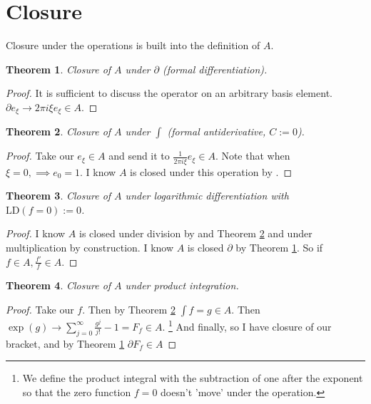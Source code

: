 \documentclass{artjlt}
\newtheorem{thm}{Theorem}
\newcommand{\?}{\textbackslash}
\begin{document}
\section{Closure}
   Closure under the operations is built into the definition of $A$.
   \begin{thm} \label{thm:1}
      Closure of $A$ under $\partial$ (formal differentiation).
   \end{thm}
   \begin{proof}
      It is sufficient to discuss the operator on an arbitrary basis element. $\partial e_\xi \to 2 \pi i \xi e_{\xi} \in A$.
   \end{proof}
   \begin{thm} \label{thm:2}
      Closure of $A$ under $\int$ (formal antiderivative, $C:=0$). 
   \end{thm}
   \begin{proof}
      Take our $e_\xi \in A$ and send it to $\frac{1}{2 \pi i \xi} e_{\xi} \in A$. Note that when $\xi = 0, \implies e_0 = 1$. I know $A$ is closed under this operation by \cite{Hormander1958}. 
   \end{proof}
   \begin{thm}
      Closure of $A$ under logarithmic differentiation with $\text{LD}(f=0) := 0$.
   \end{thm}
   \begin{proof}
      I know $A$ is closed under division by \cite{Hormander1958} and Theorem \ref{thm:2} and under multiplication by construction. I know $A$ is closed $\partial$ by Theorem \ref{thm:1}. So if $f \in A, \frac{f'}{f} \in A$.
   \end{proof}
   \begin{thm} \label{thm:4}
      Closure of $A$ under product integration.
   \end{thm}
   \begin{proof}
      Take our $f$. Then by Theorem \ref{thm:2} $\int f = g \in A$. Then $\exp(g) \to \sum_{j=0}^{\infty} \frac{g^j}{j!} - 1 = F_f \in A$. \footnote{We define the product integral with the subtraction of one after the exponent so that the zero function $f=0$ doesn't 'move' under the operation.}
      And finally, so I have closure of our bracket, and by Theorem \ref{thm:1} $\partial F_f \in A$    
\end{proof}
\end{document}
